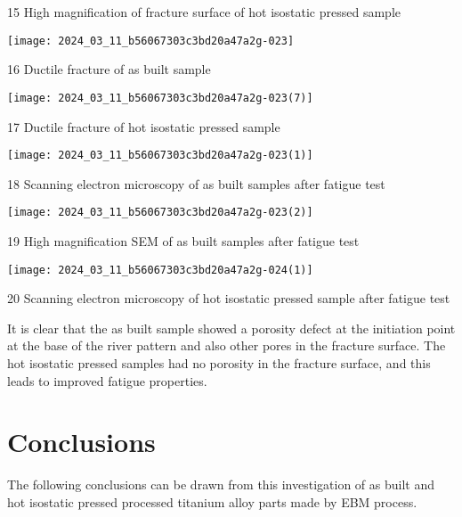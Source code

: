 \documentclass[10pt]{article}
\begin{document}
15 High magnification of fracture surface of hot isostatic pressed sample

\begin{center}
\texttt{[image: 2024\_03\_11\_b56067303c3bd20a47a2g-023]}
\end{center}

16 Ductile fracture of as built sample

\begin{center}
\texttt{[image: 2024\_03\_11\_b56067303c3bd20a47a2g-023(7)]}
\end{center}

17 Ductile fracture of hot isostatic pressed sample

\begin{center}
\texttt{[image: 2024\_03\_11\_b56067303c3bd20a47a2g-023(1)]}
\end{center}

18 Scanning electron microscopy of as built samples after fatigue test

\begin{center}
\texttt{[image: 2024\_03\_11\_b56067303c3bd20a47a2g-023(2)]}
\end{center}

19 High magnification SEM of as built samples after fatigue test

\begin{center}
\texttt{[image: 2024\_03\_11\_b56067303c3bd20a47a2g-024(1)]}
\end{center}

20 Scanning electron microscopy of hot isostatic pressed sample after fatigue test

It is clear that the as built sample showed a porosity defect at the initiation point at the base of the river pattern and also other pores in the fracture surface. The hot isostatic pressed samples had no porosity in the fracture surface, and this leads to improved fatigue properties.

\section*{Conclusions}
The following conclusions can be drawn from this investigation of as built and hot isostatic pressed processed titanium alloy parts made by EBM process.
\end{document}
